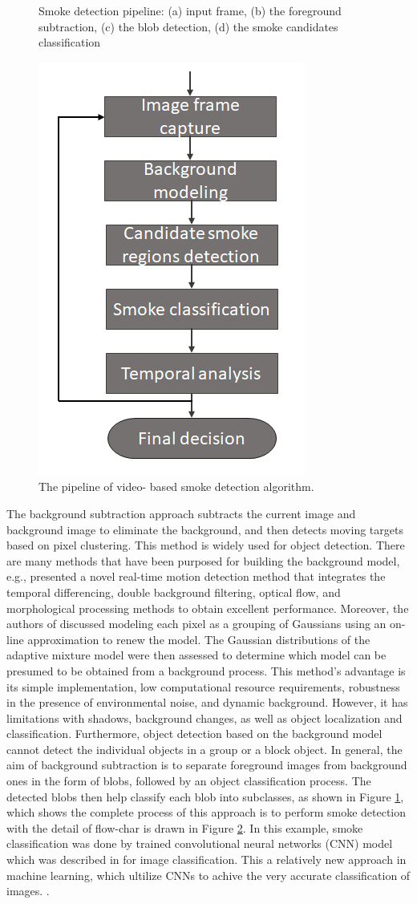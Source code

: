 \begin{figure}
{}
\caption{Smoke detection pipeline: (a) input frame, (b) the foreground subtraction, (c) the blob detection, (d) the smoke candidates classification }
\label{fig:bgmethod}
\end{figure}
\begin{figure}
\centering
 \includegraphics[width=0.3\linewidth]{Figures/smoke.jpg}
 \caption{The pipeline of video- based smoke detection algorithm.}
 \label{fig:smoke}
\end{figure}
The background subtraction approach \cite{lee2012adaptive}\cite{stauffer1999adaptive} subtracts the current image and background image to eliminate the background, and then detects moving targets based on pixel clustering. This method is widely used for object detection. There are many methods that have been purposed for building the background model, e.g.,  \cite{lu2008improved} presented a novel real-time motion detection method that integrates the temporal differencing, double background filtering, optical flow, and morphological processing methods to obtain excellent performance. Moreover, the authors of \cite{stauffer1999adaptive} discussed modeling each pixel as a grouping of Gaussians using an on-line approximation to renew the model. The Gaussian distributions of the adaptive mixture model were then assessed to determine which model can be presumed to be obtained from a background process. This method’s advantage is its simple implementation, low computational resource requirements, robustness in the presence of environmental noise, and dynamic background. However, it has limitations with shadows, background changes, as well as object localization and classification. Furthermore, object detection based on the background model cannot detect the individual objects in a group or a block object. In general, the aim of background subtraction is to separate foreground images from background ones in the form of blobs, followed by an object classification process. The detected blobs then help classify each blob into subclasses, as shown in Figure \ref{fig:bgmethod}, which shows the complete process of this approach is to perform smoke detection with the detail of flow-char is drawn in Figure \ref{fig:smoke}. In this example, smoke classification was done by trained convolutional neural networks (CNN) model which was described in \cite{krizhevsky2017imagenet} for image classification. This a relatively new approach in machine learning, which ultilize CNNs to achive the very accurate classification of images. \cite{lecun2010convolutional}\cite{jarrett2009best}\cite{lee2009convolutional}. 
